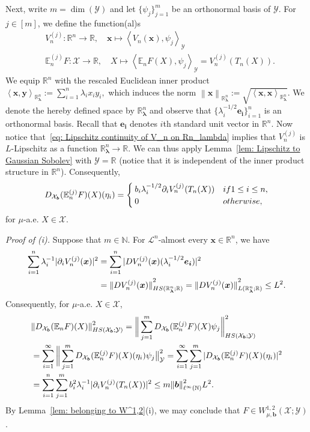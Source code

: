 \documentclass[namedate,webpdf]{ima-authoring-template-blank}
\newcommand*{\HS}{\textup{HS}}
\newcommand*{\nm}[1]{{\left\|#1\right \|}}
\newcommand*{\nmd}[1]{{\|#1\|}}    %
\newcommand{\absd}[1]{|#1|}    %
\newcommand*{\ip}[2]{\left\langle #1, #2 \right\rangle}
\numberwithin{counter}{section}
\numberwithin{equation}{section}
\theoremstyle{plain}
\theoremstyle{definition}
\newcommand*{\cL}{\mathcal{L}}
\newcommand*{\cX}{\mathcal{X}}
\newcommand*{\cY}{\mathcal{Y}}
\newcommand*{\bbE}{\mathbb{E}}
\newcommand*{\bbN}{\mathbb{N}}
\newcommand*{\bbR}{\mathbb{R}}
\theoremstyle{thmstyletwo}
\begin{document}
Next, write \( m = \dim(\cY) \) and let \(\{\psi_j\}_{j = 1}^m\) be an orthonormal basis of \(\cY\). For \(j \in [m]\), we define the function(al)s
\begin{align*}
    &V_n^{(j)}: \bbR^n \to \bbR, \quad \bm{x} \mapsto \ip{V_n(\bm{x})}{\psi_j}_{\cY} \\
    &\bbE_n^{(j)} F: \cX \to \bbR, \quad X \mapsto \ip{\bbE_n F(X)}{\psi_j}_{\cY} = V_n^{(j)}(T_n(X)).
\end{align*}
We equip \(\bbR^n\) with the rescaled Euclidean inner product
\(
\ip{\bm{x}}{\bm{y}}_{\bbR_{\bm{\lambda}}^n} := \sum_{i=1}^n \lambda_i x_i y_i,
\)
which induces the norm \(\nm{\bm{x}}_{\bbR_{\bm{\lambda}}^n} := \sqrt{\ip{\bm{x}}{\bm{x}}_{\bbR_{\bm{\lambda}}^n}}\). We denote the hereby defined space by \(\bbR_{\bm{\lambda}}^n\) and observe that \(\{\lambda_i^{-1/2} \bm{e_i}\}_{i=1}^n\) is an orthonormal basis. Recall that \( \bm{e_i} \) denotes \(i\)th standard unit vector in \( \bbR^n \).
Now notice that~\eqref{eq: Lipschitz continuity of V_n on Rn_lambda} implies that \(V_n^{(j)}\) is \(L\)-Lipschitz as a function \(\bbR_{\bm{\lambda}}^n \to \bbR\).
We can thus apply Lemma~\ref{lem: Lipschitz to Gaussian Sobolev} with \( \cY = \bbR \) (notice that it is independent of the inner product structure in \( \bbR^n \)). Consequently,
\[
D_{\cX_{\bm{b}}} (\bbE_n^{(j)}F)(X)(\eta_i) = 
\begin{cases}
    b_i \lambda_i^{-1/2} \partial_i V_n^{(j)}(T_n(X))  & \textup{if } 1 \leq i \leq n, \\
    0 & \textup{otherwise,}
\end{cases}
\]
for \( \mu \)-a.e. \(X \in \cX\).

\emph{Proof of (i).} Suppose that \( m \in \bbN \). For \(\cL^n\)-almost every \(\bm{x} \in \bbR^n\), we have
\begin{align*}
    \sum_{i=1}^n \lambda_i^{-1} \absd{\partial_i V_n^{(j)}(\bm{x})}^2
    &= \sum_{i=1}^n \absd{D V_n^{(j)}(\bm{x})(\lambda_i^{-1/2} \bm{e_i})}^2 \\
    &= \nmd{D V_n^{(j)}(\bm{x})}_{\HS(\bbR_{\bm{\lambda}}^n; \bbR)}^2 
    = \nmd{D V_n^{(j)}(\bm{x})}_{L(\bbR_{\bm{\lambda}}^n; \bbR)}^2 
    \leq L^2.
\end{align*}
Consequently, for \(\mu\)-a.e. \( X \in \cX \),
\begin{align}
    &\nm{D_{\cX_{\bm{b}}} (\bbE_n F)(X)}_{\HS(\cX_{\bm{b}};\cY)}^2 
    = \bigg\| \sum_{j = 1}^m D_{\cX_{\bm{b}}} (\bbE_n^{(j)} F)(X) \psi_j \bigg\|_{\HS(\cX_{\bm{b}};\cY)}^2 \nonumber \\
    &= \sum_{i = 1}^{\infty} \bigg\| \sum_{j = 1}^m D_{\cX_{\bm{b}}} (\bbE_n^{(j)} F)(X)(\eta_i) \psi_j \big\|_{\cY}^2
    = \sum_{i = 1}^{\infty} \sum_{j = 1}^m \absd{D_{\cX_{\bm{b}}} (\bbE_n^{(j)} F)(X)(\eta_i)}^2 \nonumber \\
    &= \sum_{i = 1}^n \sum_{j = 1}^m b_i^2 \lambda_i^{-1} \absd{\partial_i V_n^{(j)}(T_n(X))}^2 
    \leq m \nm{\bm{b}}_{\ell^{\infty}(\bbN)}^2 L^2. \label{eq: estimate of derivative of conditional expectation; finite dimension}
\end{align}
By Lemma~\ref{lem: belonging to W^1,2}(i), we may conclude that \( F \in W_{\mu, \bm{b}}^{1,2}(\cX; \cY) \).
\end{document}
